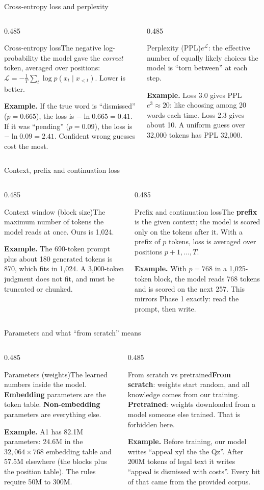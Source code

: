 \documentclass[aspectratio=169,11pt]{beamer}
\newcommand{\term}[3]{%
  \begin{block}{#1}\small #2\par\vspace{1mm}%
  {\color{exgreen}\textbf{Example.}} #3\end{block}}
\newcommand{\twoterms}[6]{%
  \begin{columns}[T]
    \begin{column}{0.485\textwidth}\term{#1}{#2}{#3}\end{column}
    \begin{column}{0.485\textwidth}\term{#4}{#5}{#6}\end{column}
  \end{columns}}
\begin{document}
\begin{frame}{Cross-entropy loss and perplexity}
  \twoterms{Cross-entropy loss}
  {The negative log-probability the model gave the \emph{correct} token, averaged over positions: $\mathcal{L}=-\frac1T\sum_t\log p(x_t\mid x_{<t})$. Lower is better.}
  {If the true word is ``dismissed'' ($p=0.665$), the loss is $-\ln 0.665 = 0.41$. If it was ``pending'' ($p=0.09$), the loss is $-\ln0.09=2.41$. Confident wrong guesses cost the most.}
  {Perplexity (PPL)}
  {$e^{\mathcal{L}}$: the effective number of equally likely choices the model is ``torn between'' at each step.}
  {Loss 3.0 gives PPL $e^3\approx20$: like choosing among 20 words each time. Loss 2.3 gives about 10. A uniform guess over 32,000 tokens has PPL 32,000.}
\end{frame}

\begin{frame}{Context, prefix and continuation loss}
  \twoterms{Context window (block size)}
  {The maximum number of tokens the model reads at once. Ours is 1,024.}
  {The 690-token prompt plus about 180 generated tokens is 870, which fits in 1,024. A 3,000-token judgment does not fit, and must be truncated or chunked.}
  {Prefix and continuation loss}
  {The \textbf{prefix} is the given context; the model is scored only on the tokens after it. With a prefix of $p$ tokens, loss is averaged over positions $p+1,\ldots,T$.}
  {With $p=768$ in a 1,025-token block, the model reads 768 tokens and is scored on the next 257. This mirrors Phase 1 exactly: read the prompt, then write.}
\end{frame}

\begin{frame}{Parameters and what ``from scratch'' means}
  \twoterms{Parameters (weights)}
  {The learned numbers inside the model. \textbf{Embedding} parameters are the token table. \textbf{Non-embedding} parameters are everything else.}
  {A1 has 82.1M parameters: 24.6M in the $32{,}064\times768$ embedding table and 57.5M elsewhere (the blocks plus the position table). The rules require 50M to 300M.}
  {From scratch vs pretrained}
  {\textbf{From scratch}: weights start random, and all knowledge comes from our training. \textbf{Pretrained}: weights downloaded from a model someone else trained. That is forbidden here.}
  {Before training, our model writes ``appeal xyl the the Qz''. After 200M tokens of legal text it writes ``appeal is dismissed with costs''. Every bit of that came from the provided corpus.}
\end{frame}
\end{document}
